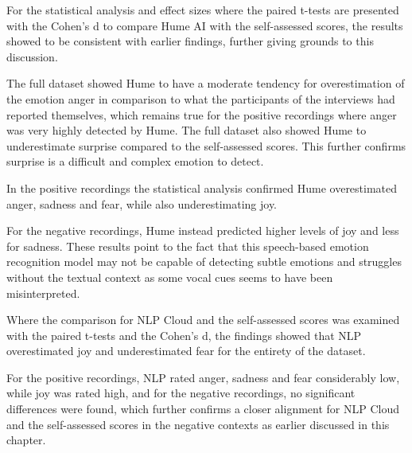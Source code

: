 For the statistical analysis and effect sizes where the paired t-tests are presented with the Cohen’s d to compare Hume AI with the self-assessed scores, the results showed to be consistent with earlier findings, further giving grounds to this discussion. 

The full dataset showed Hume to have a moderate tendency for overestimation of the emotion anger in comparison to what the participants of the interviews had reported themselves, which remains true for the positive recordings where anger was very highly detected by Hume. The full dataset also showed Hume to underestimate surprise compared to the self-assessed scores. This further confirms surprise is a difficult and complex emotion to detect.

In the positive recordings the statistical analysis confirmed Hume overestimated anger, sadness and fear, while also underestimating joy. 

For the negative recordings, Hume instead predicted higher levels of joy and less for sadness. These results point to the fact that this speech-based emotion recognition model may not be capable of detecting subtle emotions and struggles without the textual context as some vocal cues seems to have been misinterpreted.

Where the comparison for NLP Cloud and the self-assessed scores was examined with the paired t-tests and the Cohen’s d, the findings showed that NLP overestimated joy and underestimated fear for the entirety of the dataset.

For the positive recordings, NLP rated anger, sadness and fear considerably low, while joy was rated high, and for the negative recordings, no significant differences were found, which further confirms a closer alignment for NLP Cloud and the self-assessed scores in the negative contexts as earlier discussed in this chapter.

